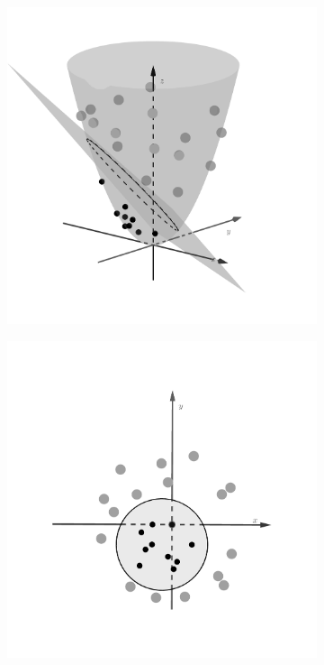 \begin{figure}[t]
\begin{subfigure}{0.325\textwidth}
\includegraphics[width=\linewidth]{Chapters/09_SupportVectorMachines/21_kernelsvm/52_gray.png} %
\caption{}
\end{subfigure}
\begin{subfigure}{0.325\textwidth}
\includegraphics[width=\linewidth]{Chapters/09_SupportVectorMachines/21_kernelsvm/62_gray.png} %
\caption{}
\end{subfigure}


\end{figure}
